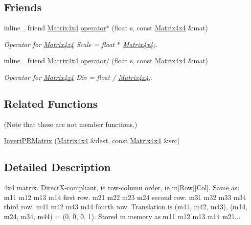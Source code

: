 \subsection*{Friends}
\begin{DoxyCompactItemize}
\item 
\hypertarget{class_matrix4x4_ab3955edca55444de0746eb97b6c7e147}{inline\+\_\+ friend \hyperlink{class_matrix4x4}{Matrix4x4} \hyperlink{class_matrix4x4_ab3955edca55444de0746eb97b6c7e147}{operator$\ast$} (float s, const \hyperlink{class_matrix4x4}{Matrix4x4} \&mat)}\label{class_matrix4x4_ab3955edca55444de0746eb97b6c7e147}

\begin{DoxyCompactList}\small\item\em Operator for \hyperlink{class_matrix4x4}{Matrix4x4} Scale = float $\ast$ \hyperlink{class_matrix4x4}{Matrix4x4};. \end{DoxyCompactList}\item 
\hypertarget{class_matrix4x4_a07714d6be5eeb50d185286661ee092e0}{inline\+\_\+ friend \hyperlink{class_matrix4x4}{Matrix4x4} \hyperlink{class_matrix4x4_a07714d6be5eeb50d185286661ee092e0}{operator/} (float s, const \hyperlink{class_matrix4x4}{Matrix4x4} \&mat)}\label{class_matrix4x4_a07714d6be5eeb50d185286661ee092e0}

\begin{DoxyCompactList}\small\item\em Operator for \hyperlink{class_matrix4x4}{Matrix4x4} Div = float / \hyperlink{class_matrix4x4}{Matrix4x4};. \end{DoxyCompactList}\end{DoxyCompactItemize}
\subsection*{Related Functions}
(Note that these are not member functions.) \begin{DoxyCompactItemize}
\item 
\hyperlink{class_matrix4x4_a48b3547948dc1927b8df321aa64f5516}{Invert\+P\+R\+Matrix} (\hyperlink{class_matrix4x4}{Matrix4x4} \&dest, const \hyperlink{class_matrix4x4}{Matrix4x4} \&src)
\end{DoxyCompactItemize}


\subsection{Detailed Description}
4x4 matrix. Direct\+X-\/compliant, ie row-\/column order, ie m\mbox{[}Row\mbox{]}\mbox{[}Col\mbox{]}. Same as\+: m11 m12 m13 m14 first row. m21 m22 m23 m24 second row. m31 m32 m33 m34 third row. m41 m42 m43 m44 fourth row. Translation is (m41, m42, m43), (m14, m24, m34, m44) = (0, 0, 0, 1). Stored in memory as m11 m12 m13 m14 m21...

